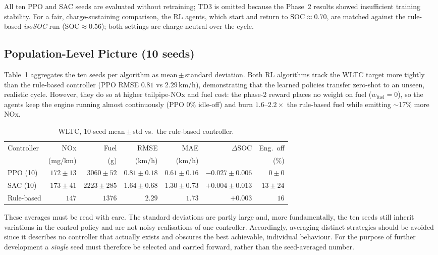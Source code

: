All ten PPO and SAC seeds are evaluated without retraining; TD3 is omitted because the Phase~2 results showed insufficient training stability. For a fair, charge-sustaining comparison, the \ac{RL} agents, which start and return to $\mathrm{SOC}\approx0.70$, are matched against the rule-based \emph{isoSOC} run ($\mathrm{SOC}\approx0.56$); both settings are charge-neutral over the cycle.

\subsection{Population-Level Picture (10 seeds)}

Table~\ref{tab:wltc-mean} aggregates the ten seeds per algorithm as mean\,$\pm$\,standard deviation. Both RL algorithms track the WLTC target more tightly than the rule-based controller (PPO RMSE $0.81$ vs $2.29$\,km/h),
demonstrating that the learned policies transfer zero-shot to an unseen, realistic cycle. However, they do so at higher tailpipe-\ac{NOx} and fuel cost: the phase-2 reward places no weight on fuel ($w_\text{fuel}=0$), so the agents keep the engine running almost continuously (PPO $0\%$ idle-off) and burn $1.6$--$2.2\times$ the rule-based fuel while emitting $\sim$17\% more \ac{NOx}.

\begin{table}[H]
  \centering
  \small
  \begin{tabular}{lrrrrrr}
    \toprule
    Controller & NOx & Fuel & RMSE & MAE & $\Delta$SOC & Eng.\ off \\
    & (mg/km) & (g) & (km/h) & (km/h) & & (\%) \\
    \midrule
    PPO (10)   & $172\pm13$ & $3060\pm52$  & $0.81\pm0.18$ & $0.61\pm0.16$ & $-0.027\pm0.006$ & $0\pm0$  \\
    SAC (10)   & $173\pm41$ & $2223\pm285$ & $1.64\pm0.68$ & $1.30\pm0.73$ & $+0.004\pm0.013$ & $13\pm24$ \\
    Rule-based & $147$      & $1376$       & $2.29$        & $1.73$        & $+0.003$         & $16$ \\
    \bottomrule
  \end{tabular}
  \caption[WLTC 10-seed mean comparison]{WLTC, 10-seed mean\,$\pm$\,std vs.\ the rule-based controller.}
  \label{tab:wltc-mean}
\end{table}

These averages must be read with care. The standard deviations are partly large and, more fundamentally, the ten seeds still inherit variations in the control policy and are not noisy realisations of one controller. Accordingly, averaging distinct strategies should be avoided since it describes no controller that actually exists and obscures the best achievable, individual behaviour. For the purpose of further development a \emph{single} seed must therefore be selected and carried forward, rather than the seed-averaged number.

